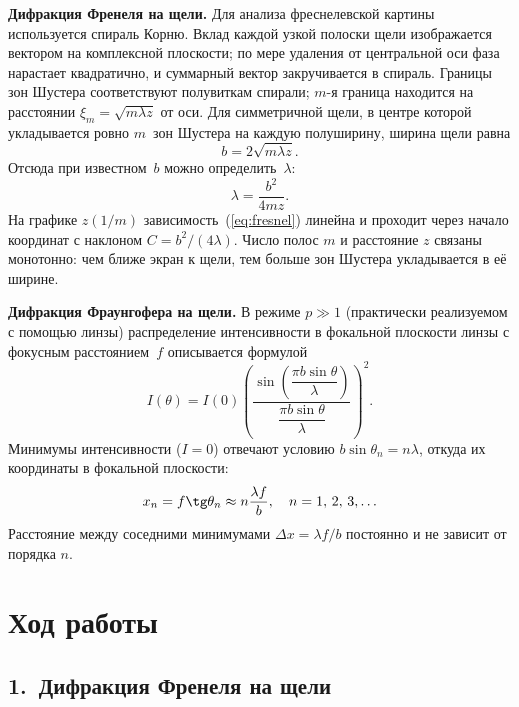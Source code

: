 \documentclass[twoside]{mfitjournal}
\begin{document}
\textbf{Дифракция Френеля на щели.}
Для анализа фреснелевской картины используется спираль Корню.
Вклад каждой узкой полоски щели изображается вектором на комплексной
плоскости; по мере удаления от центральной оси фаза нарастает
квадратично, и суммарный вектор закручивается в спираль.
Границы зон Шустера соответствуют полувиткам спирали; $m$-я граница
находится на расстоянии $\xi_m = \sqrt{m\lambda z}$ от оси.
Для симметричной щели, в центре которой укладывается ровно $m$~зон
Шустера на каждую полуширину, ширина щели равна
\begin{equation}\label{eq:fresnel}
    b = 2\sqrt{m\lambda z}.
\end{equation}
Отсюда при известном~$b$ можно определить~$\lambda$:
\begin{equation}\label{eq:lambda}
    \lambda = \frac{b^2}{4mz}.
\end{equation}
На графике $z(1/m)$ зависимость~(\ref{eq:fresnel}) линейна и проходит
через начало координат с наклоном $C = b^2/(4\lambda)$.
Число полос $m$ и расстояние $z$ связаны монотонно: чем ближе экран к
щели, тем больше зон Шустера укладывается в её ширине.

\textbf{Дифракция Фраунгофера на щели.}
В режиме $p\gg 1$ (практически реализуемом с помощью линзы) распределение
интенсивности в фокальной плоскости линзы с фокусным расстоянием~$f$
описывается формулой
\begin{equation}\label{eq:sinc}
    I(\theta) = I(0)\left(\frac{\sin\!\left(\dfrac{\pi b \sin\theta}{\lambda}\right)}
                                {\dfrac{\pi b \sin\theta}{\lambda}}\right)^{2}.
\end{equation}
Минимумы интенсивности ($I = 0$) отвечают условию $b\sin\theta_n = n\lambda$,
откуда их координаты в фокальной плоскости:
\begin{equation}\label{eq:fraun}
    x_n = f\tg\theta_n \approx n\frac{\lambda f}{b}, \quad n = 1,\,2,\,3,\ldots
\end{equation}
Расстояние между соседними минимумами $\Delta x = \lambda f / b$ постоянно
и не зависит от порядка $n$.

\section*{Ход работы}

\subsection*{1.\ Дифракция Френеля на щели}
\end{document}
